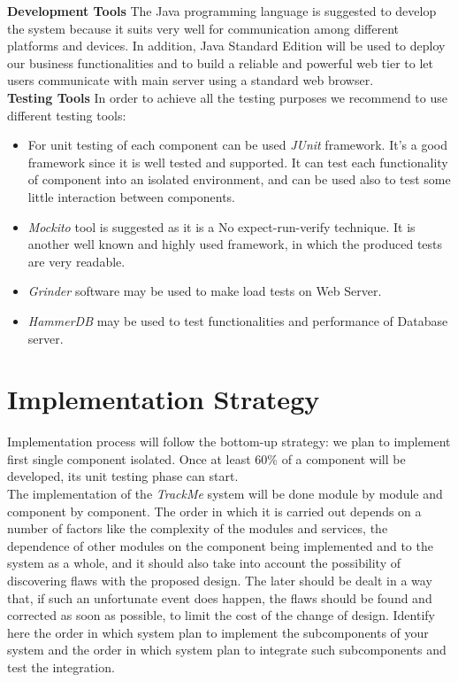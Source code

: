 \documentclass[a4paper, hidelinks, 12pt]{report}
\begin{document}
\textbf{Development Tools} The Java programming language is suggested to develop the system because it suits very well for communication among different platforms and devices. In addition, Java Standard Edition will be used to deploy our business functionalities and to build a reliable and powerful web tier to let users communicate with main server using a standard web browser. \\

\textbf{Testing Tools} In order to achieve all the testing purposes we recommend to use different testing tools:
\begin{itemize}
\item{} For unit testing of each component can be used \textit{JUnit} framework. It’s a good framework since it is well tested and supported. It can test each functionality of component into an isolated environment, and can be used also to test some little interaction between components.
\item{}\textit{Mockito} tool is suggested as it is a No expect-run-verify technique. It is another well known and highly used framework, in which the produced tests are very readable.
\item{} \textit{Grinder} software may be used to make load tests on Web Server.
\item{} \textit{HammerDB} may be used to test functionalities and performance of Database server.
\end{itemize}

\section{Implementation Strategy}
Implementation process will follow the bottom-up strategy: we plan to implement first single component isolated. Once at least 60\% of a component will be developed, its unit testing phase can start.\\

The implementation of the \textit{TrackMe} system will be done module by module and component by component. The order in which it is carried out depends on a number of factors like the complexity of the modules and services, the dependence of other modules on the component being implemented and to the system as a whole, and it should also take into account the possibility of discovering flaws with the proposed design. The later should be dealt in a way that, if such an unfortunate event does	happen, the flaws should be found and corrected as soon as possible, to limit the cost of the change of design. Identify here the order in which system plan to implement the subcomponents of your system and the order in which system plan to integrate such subcomponents and test the integration.\\
\end{document}
